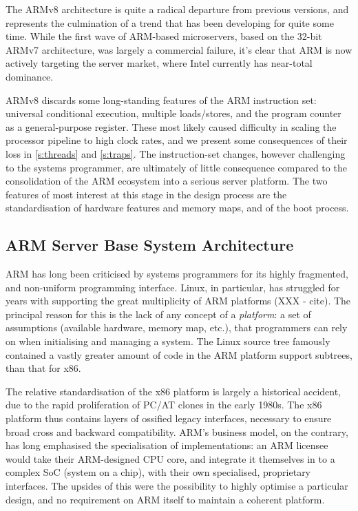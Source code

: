 \documentclass[a4paper,twoside]{report}
\begin{document}
The ARMv8 architecture is quite a radical departure from previous versions,
and represents the culmination of a trend that has been developing for quite
some time. While the first wave of ARM-based microservers, based on the 32-bit
ARMv7 architecture, was largely a commercial failure, it's clear that ARM is
now actively targeting the server market, where Intel currently has near-total
dominance.

ARMv8 discards some long-standing features of the ARM instruction set:
universal conditional execution, multiple loads/stores, and the program
counter as a general-purpose register. These most likely caused difficulty in
scaling the processor pipeline to high clock rates, and we present some
consequences of their loss in \autoref{s:threads} and \autoref{s:traps}. The
instruction-set changes, however challenging to the systems programmer, are
ultimately of little consequence compared to the consolidation of the ARM
ecosystem into a serious server platform. The two features of most interest at
this stage in the design process are the standardisation of hardware features
and memory maps, and of the boot process.

\subsection{ARM Server Base System Architecture}\label{s:sbsa}

ARM has long been criticised by systems programmers for its highly fragmented,
and non-uniform programming interface. Linux, in particular, has struggled for
years with supporting the great multiplicity of ARM platforms (XXX - cite).
The principal reason for this is the lack of any concept of a \emph{platform}:
a set of assumptions (available hardware, memory map, etc.), that programmers
can rely on when initialising and managing a system. The Linux source tree
famously contained a vastly greater amount of code in the ARM platform support
subtrees, than that for x86.

The relative standardisation of the x86 platform is largely a historical
accident, due to the rapid proliferation of PC/AT clones in the early 1980s.
The x86 platform thus contains layers of ossified legacy interfaces, necessary
to ensure broad cross and backward compatibility.  ARM's business model, on
the contrary, has long emphasised the specialisation of implementations: an
ARM licensee would take their ARM-designed CPU core, and integrate it
themselves in to a complex SoC (system on a chip), with their own specialised,
proprietary interfaces. The upsides of this were the possibility to highly
optimise a particular design, and no requirement on ARM itself to maintain a
coherent platform.
\end{document}
